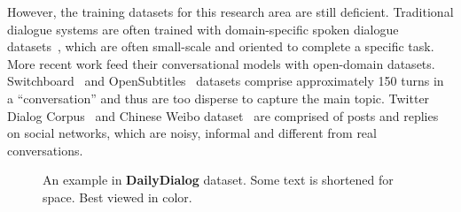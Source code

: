 \documentclass[11pt,letterpaper]{article}
\begin{document}
However, the training datasets for this research area are still deficient. Traditional dialogue systems are often trained with domain-specific spoken dialogue datasets~\cite{trains,dbox}, which are often small-scale and oriented to complete a specific task. More recent work feed their conversational models with open-domain datasets. Switchboard~\cite{switchboard} and OpenSubtitles~\cite{opensubtitles} datasets comprise approximately 150 turns in a ``conversation'' and thus are too disperse to capture the main topic. Twitter Dialog Corpus~\cite{twitter} and Chinese Weibo dataset~\cite{weibo} are comprised of posts and replies on social networks, which are noisy, informal and different from real conversations.
\begin{figure}
\caption{An example in \textbf{DailyDialog} dataset. Some text is shortened for space. Best viewed in color.}
\label{fig:example}
\end{figure}
\end{document}
